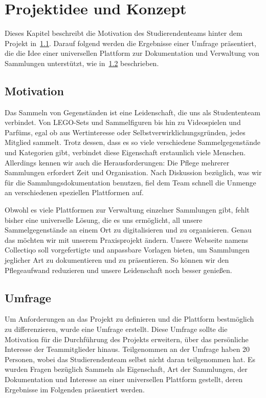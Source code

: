 \section{Projektidee und Konzept}\label{sec:projektidee-und-konzept}

Dieses Kapitel beschreibt die Motivation des Studierendenteams hinter dem Projekt in~\ref{subsec:motivation}.
Darauf folgend werden die Ergebnisse einer Umfrage präsentiert, die die Idee einer universellen Plattform zur Dokumentation und Verwaltung von Sammlungen unterstützt, wie in~\ref{subsec:umfrage} beschrieben.

\subsection{Motivation}\label{subsec:motivation}


Das Sammeln von Gegenständen ist eine Leidenschaft, die uns als Studententeam verbindet.
Von LEGO-Sets und Sammelfiguren bis hin zu Videospielen und Parfüms, egal ob aus Wertinteresse oder Selbstverwirklichungsgründen, jedes Mitglied sammelt.
Trotz dessen, dass es so viele verschiedene Sammelgegenstände und Kategorien gibt, verbindet diese Eigenschaft erstaunlich viele Menschen.
Allerdings kennen wir auch die Herausforderungen: Die Pflege mehrerer Sammlungen erfordert Zeit und Organisation.
Nach Diskussion bezüglich, was wir für die Sammlungsdokumentation benutzen, fiel dem Team schnell die Unmenge an verschiedenen speziellen Plattformen auf. \par
Obwohl es viele Plattformen zur Verwaltung einzelner Sammlungen gibt, fehlt bisher eine universelle Lösung, die es uns ermöglicht, all unsere Sammelgegenstände an einem Ort zu digitalisieren und zu organisieren.
Genau das möchten wir mit unserem Praxisprojekt ändern.
Unsere Webseite namens Collectiqo soll vorgefertigte und anpassbare Vorlagen bieten, um Sammlungen jeglicher Art zu dokumentieren und zu präsentieren.
So können wir den Pflegeaufwand reduzieren und unsere Leidenschaft noch besser genießen.


\subsection{Umfrage}\label{subsec:umfrage}

Um Anforderungen an das Projekt zu definieren und die Plattform bestmöglich zu differenzieren, wurde eine Umfrage erstellt.
Diese Umfrage sollte die Motivation für die Durchführung des Projekts erweitern, über das persönliche Interesse der Teammitglieder hinaus.
Teilgenommen an der Umfrage haben 20 Personen, wobei das Studierendenteam selbst nicht daran teilgenommen hat.
Es wurden Fragen bezüglich Sammeln als Eigenschaft, Art der Sammlungen, der Dokumentation und Interesse an einer universellen Plattform gestellt, deren Ergebnisse im Folgenden präsentiert werden.

